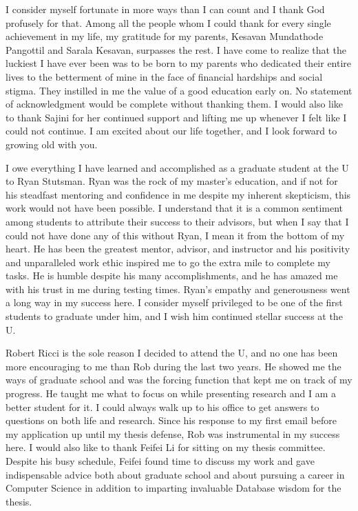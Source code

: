 I consider myself fortunate in more ways than I can count and I thank God profusely for that. 
Among all the people whom I could thank for every single achievement in my life, my gratitude for my parents, Kesavan Mundathode Pangottil and Sarala Kesavan, surpasses the rest. 
I have come to realize that the luckiest I have ever been was to be born to my parents who dedicated their entire lives to the betterment of mine in the face of financial hardships and social stigma. 
They instilled in me the value of a good education early on. No statement of acknowledgment would be complete without thanking them. I would also like to thank Sajini for her continued support and lifting 
me up whenever I felt like I could not continue. I am excited about our life together, and I look forward to growing old with you.

I owe everything I have learned and accomplished as a graduate student at the U to Ryan Stutsman. 
Ryan was the rock of my master's education, and if not for his steadfast mentoring and confidence in me despite my inherent skepticism, this work would not have been possible. 
I understand that it is a common sentiment among students to attribute their success to their advisors, but when I say that I could not have done any of this without Ryan, I mean it from the bottom of my heart. 
He has been the greatest mentor, advisor, and instructor and his positivity and unparalleled work ethic inspired me to go the extra mile to complete my tasks. 
He is humble despite his many accomplishments, and he has amazed me with his trust in me during testing times. 
Ryan's empathy and generousness went a long way in my success here. 
I consider myself privileged to be one of the first students to graduate under him, and I wish him continued stellar success at the U.

Robert Ricci is the sole reason I decided to attend the U, and no one has been more \linebreak encouraging to me than Rob during the last two years.
He showed me the ways of \linebreak graduate school and was the forcing function that kept me on track of my progress. 
He taught me what to focus on while presenting research and I am a better student for it.\linebreak 
I could always walk up to his office to get answers to questions on both life and research. 
Since his response to my first email before my application up until my thesis defense, \linebreak Rob was instrumental in my success here. 
I would also like to thank Feifei Li for sitting on my thesis committee. Despite his busy schedule, Feifei found time to discuss my work and gave indispensable advice both about graduate school and about pursuing a career in Computer Science in addition to imparting invaluable Database wisdom for the thesis.

